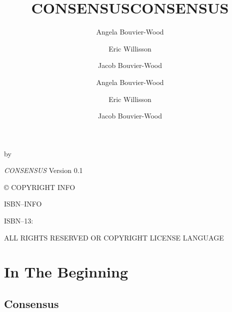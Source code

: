 \documentclass[
  oneside,
  statementpaper,
  9pt]{memoir}
\title{CONSENSUS}
\author{Angela Bouvier-Wood \and Eric Willisson \and Jacob Bouvier-Wood}
\date{} %
\author{Angela Bouvier-Wood \and Eric Willisson \and Jacob Bouvier-Wood}
\title{CONSENSUS}
\date{}
\makeatletter
\def\maketitle{%
  \null
  \thispagestyle{empty}%
  \vfill
  \begin{center}\leavevmode
    \chapterfont
    {\HUGE\center \@title\par}%
\vskip 5cm
    \normalfont
    {\normalsize\center by}\par
    {\large\center \@author\par}%
    \vskip 1cm
  \end{center}%
  \vfill
  \null
  \cleardoublepage
  }
\makeatother
\begin{document}
\let\cleardoublepage\clearpage


\maketitle






\frontmatter

\null\vfill

\begin{flushleft}
\textit{CONSENSUS}
Version 0.1

© COPYRIGHT INFO


ISBN--INFO

ISBN--13: 
\bigskip





ALL RIGHTS RESERVED OR COPYRIGHT LICENSE LANGUAGE




\end{flushleft}
\let\cleardoublepage\clearpage

\mainmatter

{
\tableofcontents
}

\hypertarget{in-the-beginning}{%
\chapter{In The Beginning}\label{in-the-beginning}}

\hypertarget{consensus}{%
\section{Consensus}\label{consensus}}
\end{document}
